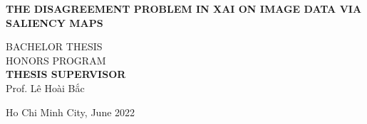 \begin{titlepage}
\begin{center}
{ \Large \bfseries THE DISAGREEMENT PROBLEM IN XAI ON IMAGE DATA VIA SALIENCY MAPS\\[2cm] } 


\large BACHELOR THESIS\\
\large HONORS PROGRAM\\[2cm]

\textbf{THESIS SUPERVISOR}\\
Prof. Lê Hoài Bắc\\


\vfill
Ho Chi Minh City, June 2022

\end{center}
\end{titlepage}
